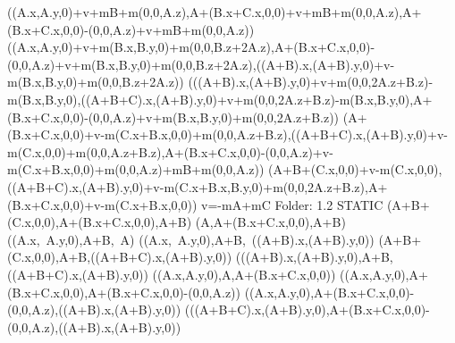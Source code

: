 \left(\left(A.x,A.y,0\right)+v+mB+m\left(0,0,A.z\right),A+\left(B.x+C.x,0,0\right)+v+mB+m\left(0,0,A.z\right),A+\left(B.x+C.x,0,0\right)-\left(0,0,A.z\right)+v+mB+m\left(0,0,A.z\right)\right)
\left(\left(A.x,A.y,0\right)+v+m\left(B.x,B.y,0\right)+m\left(0,0,B.z+2A.z\right),A+\left(B.x+C.x,0,0\right)-\left(0,0,A.z\right)+v+m\left(B.x,B.y,0\right)+m\left(0,0,B.z+2A.z\right),\left(\left(A+B\right).x,\left(A+B\right).y,0\right)+v-m\left(B.x,B.y,0\right)+m\left(0,0,B.z+2A.z\right)\right)
\left(\left(\left(A+B\right).x,\left(A+B\right).y,0\right)+v+m\left(0,0,2A.z+B.z\right)-m\left(B.x,B.y,0\right),\left(\left(A+B+C\right).x,\left(A+B\right).y,0\right)+v+m\left(0,0,2A.z+B.z\right)-m\left(B.x,B.y,0\right),A+\left(B.x+C.x,0,0\right)-\left(0,0,A.z\right)+v+m\left(B.x,B.y,0\right)+m\left(0,0,2A.z+B.z\right)\right)
\left(A+\left(B.x+C.x,0,0\right)+v-m\left(C.x+B.x,0,0\right)+m\left(0,0,A.z+B.z\right),\left(\left(A+B+C\right).x,\left(A+B\right).y,0\right)+v-m\left(C.x,0,0\right)+m\left(0,0,A.z+B.z\right),A+\left(B.x+C.x,0,0\right)-\left(0,0,A.z\right)+v-m\left(C.x+B.x,0,0\right)+m\left(0,0,A.z\right)+mB+m\left(0,0,A.z\right)\right)
\left(A+B+\left(C.x,0,0\right)+v-m\left(C.x,0,0\right),\left(\left(A+B+C\right).x,\left(A+B\right).y,0\right)+v-m\left(C.x+B.x,B.y,0\right)+m\left(0,0,2A.z+B.z\right),A+\left(B.x+C.x,0,0\right)+v-m\left(C.x+B.x,0,0\right)\right)
v=-mA+mC
Folder: 1.2 STATIC
\left(A+B+\left(C.x,0,0\right),A+\left(B.x+C.x,0,0\right),A+B\right)
\left(A,A+\left(B.x+C.x,0,0\right),A+B\right)
\left(\left(A.x,\ A.y,0\right),A+B,\ A\right)
\left(\left(A.x,\ A.y,0\right),A+B,\ \left(\left(A+B\right).x,\left(A+B\right).y,0\right)\right)
\left(A+B+\left(C.x,0,0\right),A+B,\left(\left(A+B+C\right).x,\left(A+B\right).y,0\right)\right)
\left(\left(\left(A+B\right).x,\left(A+B\right).y,0\right),A+B,\left(\left(A+B+C\right).x,\left(A+B\right).y,0\right)\right)
\left(\left(A.x,A.y,0\right),A,A+\left(B.x+C.x,0,0\right)\right)
\left(\left(A.x,A.y,0\right),A+\left(B.x+C.x,0,0\right),A+\left(B.x+C.x,0,0\right)-\left(0,0,A.z\right)\right)
\left(\left(A.x,A.y,0\right),A+\left(B.x+C.x,0,0\right)-\left(0,0,A.z\right),\left(\left(A+B\right).x,\left(A+B\right).y,0\right)\right)
\left(\left(\left(A+B+C\right).x,\left(A+B\right).y,0\right),A+\left(B.x+C.x,0,0\right)-\left(0,0,A.z\right),\left(\left(A+B\right).x,\left(A+B\right).y,0\right)\right)
